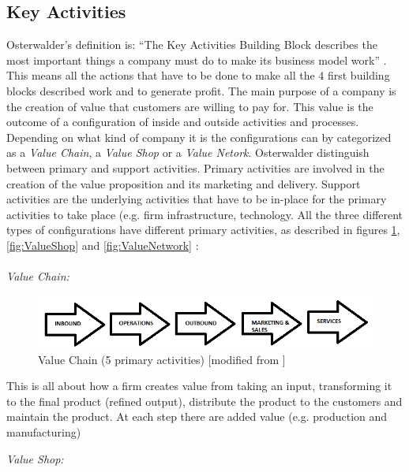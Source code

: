\subsection{Key Activities}
Osterwalder’s definition is: “The Key Activities Building Block describes the most important things a company must do to make its business model work” \cite{osterwalder}. This means all the actions that have to be done to make all the 4 first building blocks described work and to generate profit. The main purpose of a company is the creation of value that customers are willing to pay for. This value is the outcome of a configuration of inside and outside activities and processes. Depending on what kind of company it is the configurations can by categorized as a \emph{Value Chain}, a \emph{Value Shop} or a \emph{Value Netork}. Osterwalder distinguish between primary and support activities. Primary activities are involved in the creation of the value proposition and its marketing and delivery. Support activities are the underlying activities that have to be in-place for the primary activities to take place (e.g. firm infrastructure, technology. All the three different types of configurations have different primary activities, as described in  figures \ref{fig:ValueChain}, \ref{fig:ValueShop} and \ref{fig:ValueNetwork} \cite{osterwalderthesis}:\\ \\

\emph{Value Chain:} 

\begin{figure}[h]
\caption[ValueChain]{Value Chain (5 primary activities) [modified from \cite{osterwalderthesis}]}
\label{fig:ValueChain}
\begin{center}
\includegraphics[scale=0.8]{valuechain}
\end{center}
\end{figure}


This is all about how a firm creates value from taking an input, transforming it to the final product (refined output), distribute the product  to the customers and maintain the product. At each step there are added value (e.g. production and manufacturing)

\bigskip

\emph{Value Shop:}


